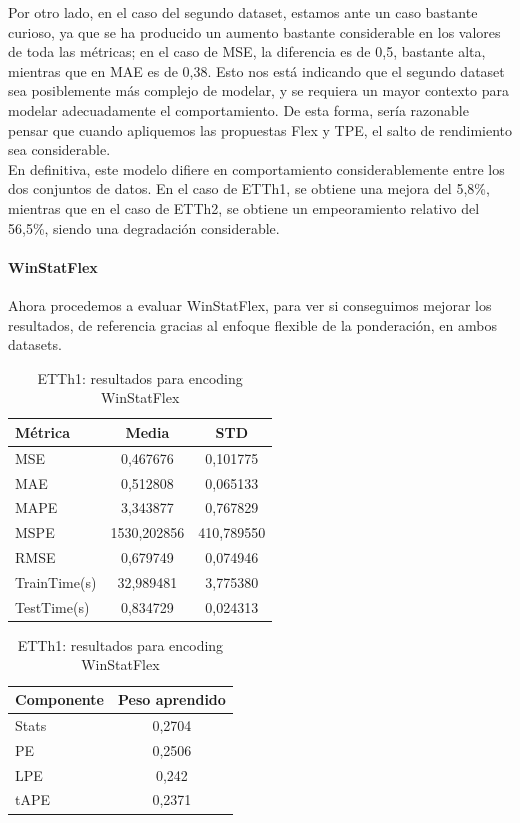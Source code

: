   Por otro lado, en el caso del segundo dataset, estamos ante un caso bastante curioso, ya que se ha producido un aumento bastante considerable en los valores de toda las métricas; en el caso de MSE, la diferencia es de 0,5, bastante alta, mientras que en MAE es de 0,38. Esto nos está indicando que el segundo dataset sea posiblemente más complejo de modelar, y se requiera un mayor contexto para modelar adecuadamente el comportamiento. De esta forma, sería razonable pensar que cuando apliquemos las propuestas Flex y TPE, el salto de rendimiento sea considerable.\\
  
  En definitiva, este modelo difiere en comportamiento considerablemente entre los dos conjuntos de datos. En el caso de ETTh1, se obtiene una mejora del 5,8\%, mientras que en el caso de ETTh2, se obtiene un empeoramiento relativo del 56,5\%, siendo una degradación considerable.
 
 \paragraph{WinStatFlex}
 
Ahora procedemos a evaluar WinStatFlex, para ver si conseguimos mejorar los resultados, de referencia gracias al enfoque flexible de la ponderación, en ambos datasets.
\begin{table}[!ht]
	\centering
	\begin{minipage}{0.5\textwidth}
		\centering
		\begin{tabular}{l|c|c}
			\toprule
			Métrica & Media & STD \\
			\midrule
			MSE & 0,467676 & 0,101775 \\
			MAE & 0,512808 & 0,065133 \\
			MAPE & 3,343877 & 0,767829 \\
			MSPE & 1530,202856 & 410,789550 \\
			RMSE & 0,679749 & 0,074946 \\
			TrainTime(s) & 32,989481 & 3,775380 \\
			TestTime(s) & 0,834729 & 0,024313 \\
			\bottomrule
		\end{tabular}
	\end{minipage}%
	\hfill
	\begin{minipage}{0.4\textwidth}
		\centering
		\begin{tabular}{l|c}
			\toprule
			Componente & Peso aprendido \\
			\midrule
			Stats & 0,2704 \\
			PE & 0,2506 \\
			LPE & 0,242 \\
			tAPE & 0,2371 \\
			\bottomrule
		\end{tabular}
	\end{minipage}
	
	\caption{ETTh1: resultados para encoding WinStatFlex}
	\label{etth1flex}
\end{table}


